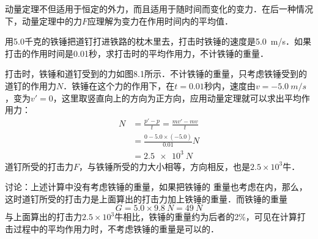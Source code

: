 动量定理不但适用于恒定的外力，而且适用于随时间而变化的变力．在后一种情况下，动量定理中的力$F$应理解为变力在作用时间内的平均值．


\begin{example}
    用5.0千克的铁锤把道钉打进铁路的枕木里去，打击时铁锤的速度是\qty{5.0}{m/s}．如果打击的作用时间是0.01秒，求打击时的平均作用力，不计铁锤的重量．
\end{example}

\begin{figure}[H]\centering
    \caption{}
\end{figure}

\begin{solution}
    打击时，铁锤和道钉受到的力如图8.1所示．不计铁锤的重量，只考虑铁锤受到的道钉的作用力$N$．铁锤在这个力的作用下，在$t=0.01$秒内，速度由$v=\qty{-5.0}{m/s}$，变为$v'=0$，这里取竖直向上的方向为正方向，应用动量定理就可以求出平均作用力：
    \[\begin{split}
            N & =\frac{p'-p}{t}=\frac{mv'-mv}{t}         \\
              & =\frac{0-5.0\times (-5.0)}{0.01}\unit{N} \\
              & =\qty{2.5e3}{N}
        \end{split}\]
    道钉所受的打击力$F$，与铁锤所受的力大小相等，方向相反，也是$2.5\times 10^3$牛．
\end{solution}

讨论：上述计算中没有考虑铁锤的重量，如果把铁锤的
重量也考虑在内，那么，这时道钉所受的打击力是上面算出的打击力加上铁锤的重量．而铁锤的重量
\[G=5.0\times 9.8~\si{N}=\qty{49}{N} \]
与上面算出的打击力$2.5\times 10^3$牛相比，铁锤的重量约为后者的2\%，可见在计算打击过程中的平均作用力时，不考虑铁锤的重量是可以的．

